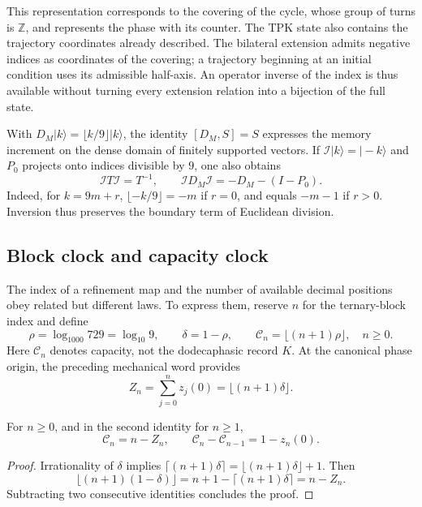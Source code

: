This representation corresponds to the covering of the cycle, whose group
of turns is \(\mathbb Z\), and represents the phase with its counter. The
TPK state also contains the trajectory coordinates already described.
The bilateral extension admits negative indices as coordinates of the
covering; a trajectory beginning at an initial condition uses
its admissible half-axis. An operator inverse of the index is thus available
without turning every extension relation into a bijection of the
full state.

With \(D_M|k\rangle=\lfloor k/9\rfloor|k\rangle\), the identity
\([D_M,S]=S\) expresses the memory increment on the dense domain of
finitely supported vectors. If \(\mathcal I|k\rangle=|-k\rangle\) and
\(P_0\) projects onto indices divisible by \(9\), one also obtains
\begin{equation}
 \mathcal I T\mathcal I=T^{-1},\qquad
 \mathcal I D_M\mathcal I=-D_M-(I-P_0).
 \label{mono-ampl:inversion-contador}
\end{equation}
Indeed, for \(k=9m+r\),
\(\lfloor-k/9\rfloor=-m\) if \(r=0\), and equals \(-m-1\) if \(r>0\).
Inversion thus preserves the boundary term of Euclidean division.

\subsection{Block clock and capacity clock}
\label{mono-ampl:relojes}

The index of a refinement map and the number of available decimal
positions obey related but different laws. To express
them, reserve \(n\) for the ternary-block index and define
\[
 \rho=\log_{1000}729=\log_{10}9,\qquad
 \delta=1-\rho,\qquad
 \mathcal C_n=\lfloor(n+1)\rho\rfloor,\quad n\geq0.
\]
Here \(\mathcal C_n\) denotes capacity, not the dodecaphasic
record \(K\). At the canonical phase origin, the preceding mechanical
word provides
\[
 Z_n=\sum_{j=0}^{n}z_j(0)=\lfloor(n+1)\delta\rfloor.
\]

\begin{proposition}
\label{mono-ampl:balance-capacidad}
For \(n\geq0\), and in the second identity for \(n\geq1\),
\[
 \mathcal C_n=n-Z_n,\qquad
 \mathcal C_n-\mathcal C_{n-1}=1-z_n(0).
\]
\end{proposition}
\begin{proof}
Irrationality of \(\delta\) implies
\(\lceil(n+1)\delta\rceil=\lfloor(n+1)\delta\rfloor+1\).
Then
\[
 \lfloor(n+1)(1-\delta)\rfloor
 =n+1-\lceil(n+1)\delta\rceil=n-Z_n.
\]
Subtracting two consecutive identities concludes the proof.
\end{proof}

